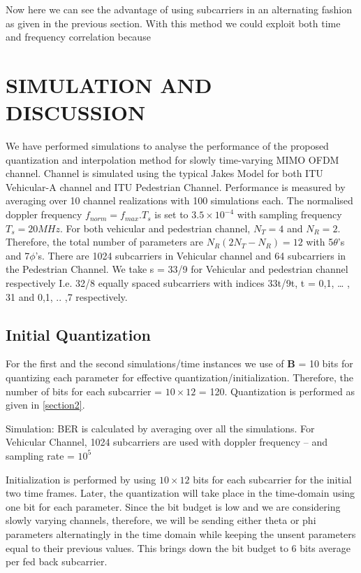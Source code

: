 \documentclass[conference]{IEEEtran}
\begin{document}
Now here we can see the advantage of using subcarriers in an alternating fashion as given in the previous section. With this method we could exploit both time and frequency correlation because 


\section{SIMULATION AND DISCUSSION} 
\label{section3}

 We have performed simulations to analyse the performance of the proposed quantization and interpolation method for slowly time-varying MIMO OFDM channel. Channel is simulated using the typical Jakes Model for both ITU Vehicular-A channel and ITU Pedestrian Channel. Performance is measured by averaging over 10 channel realizations with 100 simulations each. The normalised doppler frequency $f_{norm} = f_{max}.T_s$ is set to $3.5\times10^{-4}$ with sampling frequency $T_s = 20MHz$. For both vehicular and pedestrian channel, $N_T=4$ and $N_R=2$. Therefore, the total number of parameters are $N_{R}(2N_{T} - N_{R}) = 12$ with 5$\theta$’s and 7$\phi$’s. There are 1024 subcarriers in Vehicular channel and 64 subcarriers in the Pedestrian Channel. We take s = 33/9 for Vehicular and pedestrian channel respectively I.e. 32/8 equally spaced subcarriers with indices 33t/9t, t = 0,1, … , 31 and 0,1, .. ,7 respectively.  

\subsection{Initial Quantization} 
For the first and the second simulations/time instances we use of $\textbf{B}$ = 10 bits for quantizing each parameter for effective quantization/initialization. Therefore, the number of bits for each subcarrier = $10\times12$ = 120. Quantization is performed as given in \ref{section2}. 

Simulation: BER is calculated by averaging over all the simulations. For Vehicular Channel, 1024 subcarriers are used with doppler frequency – and sampling rate = $10^{5}$

Initialization is performed by using $10\times12$ bits for each subcarrier for the initial two time frames. Later, the quantization will take place in the time-domain using one bit for each parameter. Since the bit budget is low and we are considering slowly varying channels, therefore, we will be sending either theta or phi parameters alternatingly in the time domain while keeping the unsent parameters equal to their previous values. This brings down the bit budget to 6 bits average per fed back subcarrier. 
\end{document}
